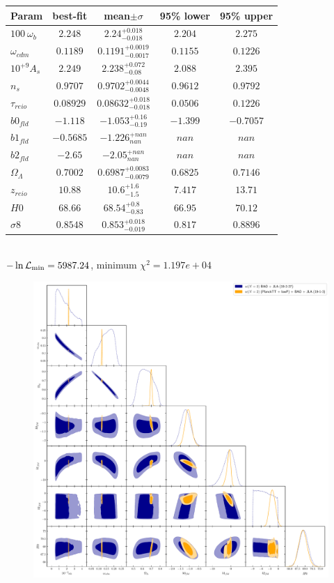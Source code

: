 \documentclass[a4paper,10pt]{article}
\begin{document}
\begin{tabular}{|l|c|c|c|c|} 
 \hline 
Param & best-fit & mean$\pm\sigma$ & 95\% lower & 95\% upper \\ \hline 
$100~\omega_{b }$ &$2.248$ & $2.24_{-0.018}^{+0.018}$ & $2.204$ & $2.275$ \\ 
$\omega_{cdm }$ &$0.1189$ & $0.1191_{-0.0017}^{+0.0019}$ & $0.1155$ & $0.1226$ \\ 
$10^{+9}A_{s }$ &$2.249$ & $2.238_{-0.08}^{+0.072}$ & $2.088$ & $2.395$ \\ 
$n_{s }$ &$0.9707$ & $0.9702_{-0.0048}^{+0.0044}$ & $0.9612$ & $0.9792$ \\ 
$\tau_{reio }$ &$0.08929$ & $0.08632_{-0.018}^{+0.018}$ & $0.0506$ & $0.1226$ \\ 
$b0_{fld }$ &$-1.118$ & $-1.053_{-0.19}^{+0.16}$ & $-1.399$ & $-0.7057$ \\ 
$b1_{fld }$ &$-0.5685$ & $-1.226_{nan}^{+nan}$ & $nan$ & $nan$ \\ 
$b2_{fld }$ &$-2.65$ & $-2.05_{nan}^{+nan}$ & $nan$ & $nan$ \\ 
$\Omega_{\Lambda }$ &$0.7002$ & $0.6987_{-0.0079}^{+0.0083}$ & $0.6825$ & $0.7146$ \\ 
$z_{reio }$ &$10.88$ & $10.6_{-1.5}^{+1.6}$ & $7.417$ & $13.71$ \\ 
$H0$ &$68.66$ & $68.54_{-0.83}^{+0.8}$ & $66.95$ & $70.12$ \\ 
$\sigma8$ &$0.8548$ & $0.853_{-0.019}^{+0.018}$ & $0.817$ & $0.8896$ \\ 
\hline 
 \end{tabular} \\ 
$-\ln{\cal L}_\mathrm{min} =5987.24$, minimum $\chi^2=1.197e+04$ \\ 




\begin{figure}[h]
 \centering
 \includegraphics[scale=0.5]{N2_experiments.pdf}
\end{figure}
\end{document}
